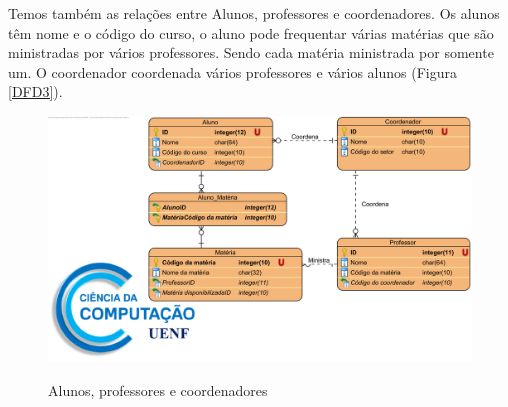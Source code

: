             Temos também as relações entre Alunos, professores e coordenadores. Os alunos têm nome e o código do curso, o aluno pode frequentar várias matérias que são ministradas por vários professores. Sendo cada matéria ministrada por somente um. O coordenador coordenada vários professores e vários alunos (Figura \ref{DFD3}).
            \begin{figure}[htbp]\centering
                \caption{Alunos, professores e coordenadores}
                \includegraphics[scale=0.7]{Pictures/JV/DER/DER - Aluno_coord_prof.png}
                \label{DER3}
            \end{figure}    %
